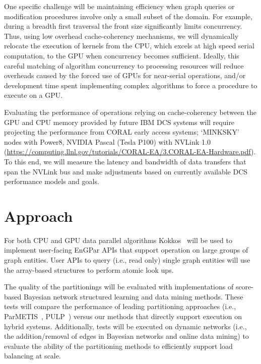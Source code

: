 \documentclass{article}
\begin{document}
One specific challenge will be maintaining efficiency when graph queries or
modification procedures involve only a small subset of the domain.
For example, during a breadth first traversal the front size significantly limits
concurrency.
Thus, using low overhead cache-coherency mechanisms, we will dynamically
relocate the execution of kernels from the CPU, which excels at high speed
serial computation, to the GPU when concurrency becomes sufficient.
Ideally, this careful matching of algorithm concurrency to processing resources
will reduce overheads caused by the forced use of GPUs for near-serial
operations, and/or development time spent implementing complex algorithms to
force a procedure to execute on a GPU.

Evaluating the performance of operations relying on cache-coherency between the
GPU and CPU memory provided by future IBM DCS systems will require projecting the
performance from CORAL early access systems; `MINKSKY' nodes with
Power8, NVIDIA Pascal (Tesla P100) with NVLink 1.0
(\url{https://computing.llnl.gov/tutorials/CORAL-EA/3.CORAL-EA-Hardware.pdf}).
To this end, we will measure the latency and bandwidth of data transfers
that span the NVLink bus and make adjustments based on currently
available DCS performance models and goals.

\section{Approach}

For both CPU and GPU data parallel algorithms Kokkos~\cite{edwards2013kokkos}
will be used to implement user-facing EnGPar APIs that support operation on
large groups of graph entities.
User APIs to query (i.e., read only) single graph entities will use the
array-based structures to perform atomic look ups.

The quality of the partitionings will be evaluated with implementations of
score-based Bayesian network structured learning and data mining methods.
These tests will compare the performance of leading partitioning approaches
(i.e., ParMETIS~\cite{abou2006multilevel}, PULP~\cite{slota_ipdps2017}) versus
our methods that directly support execution on hybrid systems.
Additionally, tests will be executed on dynamic networks (i.e., the
addition/removal of edges in Bayesian networks and online data mining) to
evaluate the ability of the partitioning methods to efficiently support load
balancing at scale.



\end{document}
